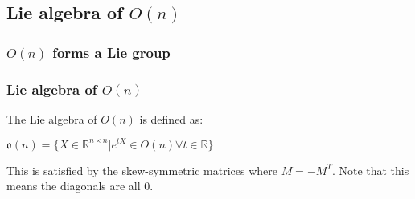 
\subsection{Lie algebra of \(O(n)\)}

\subsubsection{\(O(n)\) forms a Lie group}

\subsubsection{Lie algebra of \(O(n)\)}

The Lie algebra of \(O(n)\) is defined as:

\(\mathfrak{o}(n)=\{X\in \mathbb {R}^{n\times n}|e^{tX}\in O(n) \forall t\in \mathbb{R}\}\)

This is satisfied by the skew-symmetric matrices where \(M=-M^T\). Note that this means the diagonals are all \(0\).

